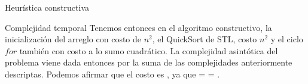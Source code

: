 \begin{section}{Heurística constructiva}
\begin{subsection}{Complejidad temporal}
			Tenemos entonces en el algoritmo constructivo, la inicialización del arreglo con costo de $n^2$, el QuickSort de STL, costo $n^2$ y el ciclo $for$ también con costo a lo sumo cuadrático. La complejidad asintótica del problema viene dada entonces por la suma de las complejidades anteriormente descriptas. Podemos afirmar que el costo es , ya que  =  = .
			
		\end{subsection}

\end{section}

